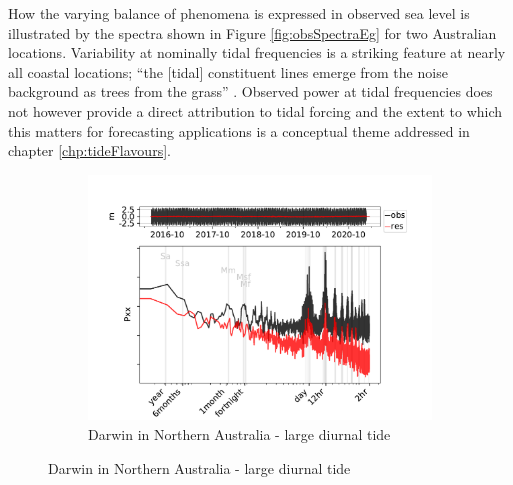 How the varying balance of phenomena is expressed in observed sea level is illustrated by the spectra shown in Figure \ref{fig:obsSpectraEg} for two Australian locations.   Variability at nominally tidal frequencies is a striking feature at nearly all coastal locations;  ``the [tidal] constituent lines emerge from the noise background as trees from the grass'' \citep{godin:1972}.
Observed power at tidal frequencies does not however provide a direct attribution to tidal forcing and the extent to which this matters for forecasting applications is a conceptual theme addressed in chapter \ref{chp:tideFlavours}.
\begin{figure}[!hbt]\centering
    \begin{subfigure}[b]{\figwidthFull}
        \includegraphics[trim={0 0 0 35mm},clip,width=\textwidth]{figures/plots/014072_verify_Pxx.pdf}
        \caption{Darwin in Northern Australia - large diurnal tide}
    \end{subfigure}
    

\end{figure}
